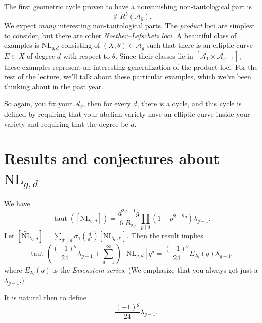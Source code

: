 \documentclass[reqno]{amsart} 
\begin{document}
The first geometric cycle proven to have a nonvanishing non-tautological part is
\begin{equation*}
  [\mathcal{A}_1 \times \mathcal{A}_5] \notin R^5(\mathcal{A}_6).
\end{equation*}
We expect \emph{many} interesting non-tautological parts.  The \emph{product} loci are simplest to consider, but there are other \emph{Noether--Lefschetz loci}.  A beautiful class of examples is $\mathrm{NL}_{g, d}$ consisting of $(X, \theta) \in \mathcal{A}_g$ such that there is an elliptic curve $E \subset X$ of degree $d$ with respect to $\theta$.  Since their classes lie in $[\mathcal{A}_1 \times \mathcal{A}_{g - 1}]$, these examples represent an interesting generalization of the product loci.  For the rest of the lecture, we'll talk about these particular examples, which we've been thinking about in the past year.

So again, you fix your $\mathcal{A}_g$, then for every $d$, there is a cycle, and this cycle is defined by requiring that your abelian variety have an elliptic curve inside your variety and requiring that the degree be $d$.

\section{Results and conjectures about $\mathrm{N L}_{g, d}$}

\begin{theorem}  We have
  \begin{equation*}
    \operatorname{taut}([\mathrm{N L}_{g, d}]) = \frac{d^{2 g - 1} g}{6 \lvert B_{2 g} \rvert}
    \prod_{p \mid d}
    \left( 1 - p^{2 - 2 g} \right) \lambda_{g - 1}.
  \end{equation*}
  Let $[\tilde{\mathrm{N L}}_{g, d}] = \sum_{d' \mid d} \sigma_1 \left( \frac{d}{d'} \right)[\mathrm{N L}_{g, d'}]$.  Then the result implies
  \begin{equation*}
    \operatorname{taut} \left( \frac{(- 1)^{g}}{24} \lambda_{g - 1} + \sum_{d = 1}^\infty \right)
    [\tilde{\mathrm{N L}}_{g, d}] q^{d}
    = \frac{(- 1)^{g}}{24}
    E_{2 g}(q)
    \lambda_{g - 1},
  \end{equation*}
  where $E_{2 g}(q)$ is the \emph{Eisenstein series}.  (We emphasize that you always get just a $\lambda_{g - 1}$.)
\end{theorem}
It is natural then to define
\begin{equation*}
  [\tilde{\mathrm{N L}}_{g, 0}] = \frac{(- 1)^{g}}{24} \lambda_{g - 1}.
\end{equation*}
\end{document}
